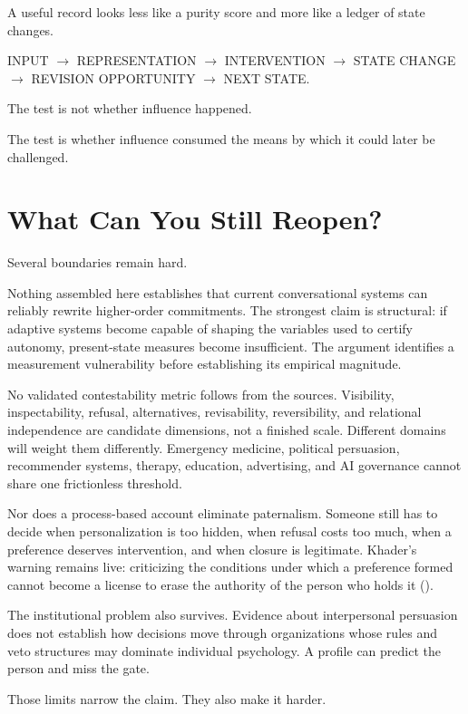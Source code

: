 \documentclass[
  10.5pt,
  letterpaper,
]{article}
\begin{document}
A useful record looks less like a purity score and more like a ledger of
state changes.

INPUT \(\rightarrow\) REPRESENTATION \(\rightarrow\) INTERVENTION
\(\rightarrow\) STATE CHANGE \(\rightarrow\) REVISION OPPORTUNITY
\(\rightarrow\) NEXT STATE.

The test is not whether influence happened.

The test is whether influence consumed the means by which it could later
be challenged.

\section{What Can You Still Reopen?}\label{what-can-you-still-reopen}

Several boundaries remain hard.

Nothing assembled here establishes that current conversational systems
can reliably rewrite higher-order commitments. The strongest claim is
structural: if adaptive systems become capable of shaping the variables
used to certify autonomy, present-state measures become insufficient.
The argument identifies a measurement vulnerability before establishing
its empirical magnitude.

No validated contestability metric follows from the sources. Visibility,
inspectability, refusal, alternatives, revisability, reversibility, and
relational independence are candidate dimensions, not a finished scale.
Different domains will weight them differently. Emergency medicine,
political persuasion, recommender systems, therapy, education,
advertising, and AI governance cannot share one frictionless threshold.

Nor does a process-based account eliminate paternalism. Someone still
has to decide when personalization is too hidden, when refusal costs too
much, when a preference deserves intervention, and when closure is
legitimate. Khader's warning remains live: criticizing the conditions
under which a preference formed cannot become a license to erase the
authority of the person who holds it
().

The institutional problem also survives. Evidence about interpersonal
persuasion does not establish how decisions move through organizations
whose rules and veto structures may dominate individual psychology. A
profile can predict the person and miss the gate.

Those limits narrow the claim. They also make it harder.
\end{document}
